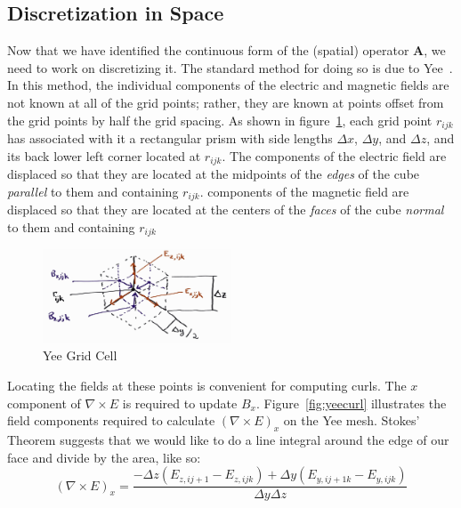 \documentclass{article}
\newcommand{\Fijk}[5]{{#1}_{{#2},{#3}{#4}{#5}}}
\newcommand{\curl}[1]{\nabla \times {#1}}
\newcommand{\dy}{\Delta y}
\newcommand{\dz}{\Delta z}
\begin{document}
\subsection{Discretization in Space}

Now that we have identified the continuous form of the (spatial) operator
$\mathbf{A}$, we need to work on discretizing it.
The standard method for doing so is due to
Yee~\cite{yee1966numerical}.
In this method, the individual components of the electric and magnetic
fields are not known at all of the grid points; rather, they are known
at points offset from the grid points by half the grid spacing.
As shown in figure~\ref{fig:yeecell}, each grid point $r_{ijk}$ has associated
with it a rectangular prism with side lengths $\Delta x$, $\Delta y$, and $\Delta
z$, and its back lower left corner located at $r_{ijk}$.
The components of the electric field are displaced so that they are located
at the midpoints of the {\em edges} of the cube {\em parallel} to them and
containing $r_{ijk}$.
components of the magnetic field are displaced so that they are
located at the centers of the {\em faces} of the cube {\em normal} to
them and containing $r_{ijk}$

\begin{figure}[htbp]
  \centering
  \includegraphics[width=0.5\textwidth]{YeeCellDiagram}
  \caption{Yee Grid Cell}
  \label{fig:yeecell}
\end{figure}

Locating the fields at these points is convenient for computing
curls.  The $x$ component of $\curl{E}$ is required to update $B_x$.
Figure~\ref{fig:yeecurl} illustrates the field components required to
calculate $(\curl{E})_x$ on the Yee mesh.  Stokes' Theorem suggests
that we would like to do a line integral around the edge of our face
and divide by the area, like so:
\[
(\curl{E})_x = \frac{- \dz (\Fijk{E}{z}{i}{j+1}{} -
  \Fijk{E}{z}{i}{j}{k}) + \dy (\Fijk{E}{y}{i}{j+1}{k} -
  \Fijk{E}{y}{i}{j}{k}) }{\dy \dz}
\]
\end{document}
